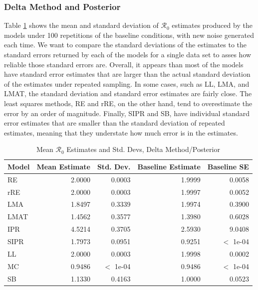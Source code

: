 \documentclass[12pt]{article}
\newcommand{\rr}{\ensuremath{\mathcal{R}_0}}
\begin{document}
\subsubsection{Delta Method and Posterior}

Table \ref{tab:rep-samp} shows the mean and standard deviation of $\rr$ estimates produced by the models under 100 repetitions of the baseline conditions, with new noise generated each time. We want to compare the standard deviations of the estimates to the standard errors returned by each of the models for a single data set to asses how reliable those standard errors are. Overall, it appears than most of the models have standard error estimates that are larger than the actual standard deviation of the estimates under repeated sampling. In some cases, such as LL, LMA, and LMAT, the standard deviation and standard error estimates are fairly close. The least squares methods, RE and rRE, on the other hand, tend to overestimate the error by an order of magnitude. Finally, SIPR and SB, have individual standard error estimates that are smaller than the standard deviation of repeated estimates, meaning that they understate how much error is in the estimates.


\begin{table}[H]
	
	\centering
	\begin{tabular}[t]{l|r|r|r|r}
		\hline
		Model & Mean Estimate & Std. Dev. & Baseline Estimate & Baseline SE\\
		\hline
		RE & 2.0000 & 0.0003 & 1.9999 & 0.0058\\
		\hline
		rRE & 2.0000 & 0.0003 & 1.9997 & 0.0052\\
		\hline
		LMA & 1.8497 & 0.3339 & 1.9974 & 0.3900\\
		\hline
		LMAT & 1.4562 & 0.3577 & 1.3980 & 0.6028 \\
		\hline
		IPR & 4.5214 & 0.3705 & 2.5930 & 9.0408\\
		\hline
		SIPR & 1.7973 & 0.0951 & 0.9251 & $<$ 1e-04 \\
		\hline
		LL & 2.0000 & 0.0003 & 1.9998 & 0.0002\\
		\hline
		MC & 0.9486 & $<$ 1e-04 & 0.9486 & $<$ 1e-04\\
		\hline
		SB & 1.1330 & 0.4163 & 1.0000 & 0.0523\\
		\hline
	\end{tabular}
        \caption{Mean $\rr$ Estimates and Std. Devs, Delta Method/Posterior}
        \label{tab:rep-samp}
\end{table}
\end{document}

